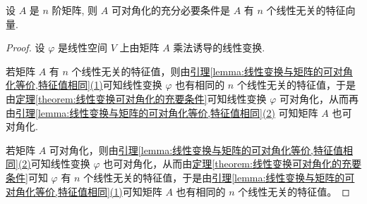 \documentclass[../../main.tex]{subfiles}%
\begin{document}
\begin{theorem}[矩阵可对角化的充要条件]\label{theorem:矩阵可对角化的充要条件}
设 $A$ 是 $n$ 阶矩阵, 则 $A$ 可对角化的充分必要条件是 $A$ 有 $n$ 个线性无关的特征向量.
\end{theorem}
\begin{proof}
设 $\varphi$ 是线性空间 $V$ 上由矩阵 $A$ 乘法诱导的线性变换.

若矩阵 $A$ 有 $n$ 个线性无关的特征值，则由\hyperref[lemma:线性变换与矩阵的可对角化等价,特征值相同]{引理\ref{lemma:线性变换与矩阵的可对角化等价,特征值相同}(1)}可知线性变换 $\varphi$ 也有相同的 $n$ 个线性无关的特征值，于是由\hyperref[theorem:线性变换可对角化的充要条件]{定理\ref{theorem:线性变换可对角化的充要条件}}可知线性变换 $\varphi$ 可对角化，从而再由\hyperref[lemma:线性变换与矩阵的可对角化等价,特征值相同]{引理\ref{lemma:线性变换与矩阵的可对角化等价,特征值相同}(2)} 可知矩阵 $A$ 也可对角化.

若矩阵 $A$ 可对角化，则由\hyperref[lemma:线性变换与矩阵的可对角化等价,特征值相同]{引理\ref{lemma:线性变换与矩阵的可对角化等价,特征值相同}(2)}可知线性变换 $\varphi$ 也可对角化，从而由\hyperref[theorem:线性变换可对角化的充要条件]{定理\ref{theorem:线性变换可对角化的充要条件}}可知 $\varphi$ 有 $n$ 个线性无关的特征值，于是由\hyperref[lemma:线性变换与矩阵的可对角化等价,特征值相同]{引理\ref{lemma:线性变换与矩阵的可对角化等价,特征值相同}(1)}可知矩阵 $A$ 也有相同的 $n$ 个线性无关的特征值。
\end{proof}
\end{document}
